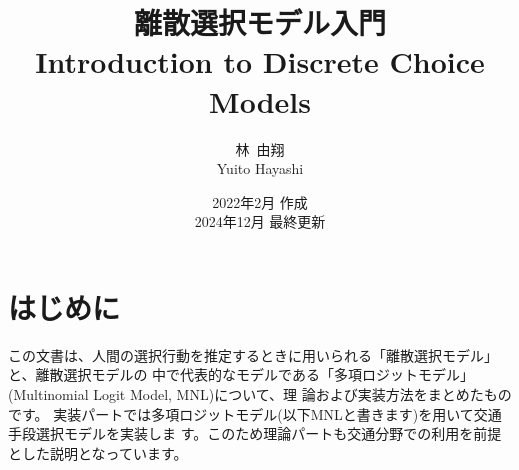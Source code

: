 \documentclass[a4paper,11pt,oneside,uplatex]{jsbook}
\title{{\huge 離散選択モデル入門}\\{\large Introduction to Discrete Choice Models} \\ 
$\,$\\$\,$\\$\,$\\$\,$\\$\,$\\$\,$\\$\,$\\}
\author{林~由翔\\Yuito Hayashi}
\date{2022年2月 作成 \\ 2024年12月 最終更新}
\theoremstyle{definition}
\begin{document}
\maketitle
\frontmatter
\chapter{はじめに}
この文書は、人間の選択行動を推定するときに用いられる「離散選択モデル」と、離散選択モデルの
中で代表的なモデルである「多項ロジットモデル」(Multinomial Logit Model, MNL)について、理
論および実装方法をまとめたものです。
実装パートでは多項ロジットモデル(以下MNLと書きます)を用いて交通手段選択モデルを実装しま
す。このため理論パートも交通分野での利用を前提とした説明となっています。

\setcounter{tocdepth}{2}
\tableofcontents

\mainmatter







\appendix


\backmatter


\end{document}
